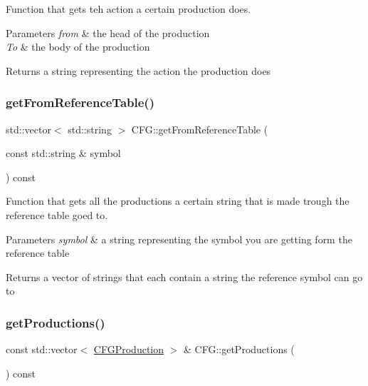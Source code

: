 Function that gets teh action a certain production does. 


\begin{DoxyParams}{Parameters}
{\em from} & the head of the production \\
\hline
{\em To} & the body of the production \\
\hline
\end{DoxyParams}
\begin{DoxyReturn}{Returns}
a string representing the action the production does 
\end{DoxyReturn}
\mbox{\label{classCFG_aefe08c649b58b046ee052b3419384509}} 
\subsubsection{\texorpdfstring{get\+From\+Reference\+Table()}{getFromReferenceTable()}}
{\footnotesize\ttfamily std\+::vector$<$ std\+::string $>$ C\+F\+G\+::get\+From\+Reference\+Table (\begin{DoxyParamCaption}\item[{const std\+::string \&}]{symbol }\end{DoxyParamCaption}) const}



Function that gets all the productions a certain string that is made trough the reference table goed to. 


\begin{DoxyParams}{Parameters}
{\em symbol} & a string representing the symbol you are getting form the reference table \\
\hline
\end{DoxyParams}
\begin{DoxyReturn}{Returns}
a vector of strings that each contain a string the reference symbol can go to 
\end{DoxyReturn}
\mbox{\label{classCFG_aa3cb4eae9c5728ad55614ea77125a9c1}} 
\subsubsection{\texorpdfstring{get\+Productions()}{getProductions()}}
{\footnotesize\ttfamily const std\+::vector$<$ \hyperlink{classCFGProduction}{C\+F\+G\+Production} $>$ \& C\+F\+G\+::get\+Productions (\begin{DoxyParamCaption}{ }\end{DoxyParamCaption}) const}



